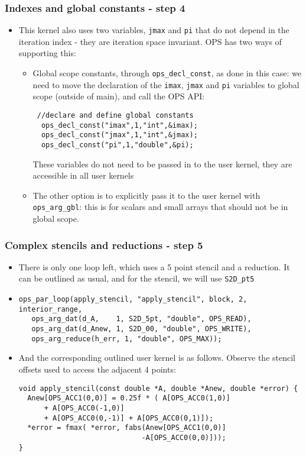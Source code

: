 \documentclass{beamer}
\begin{document}
\begin{frame}[fragile]
\frametitle{Indexes and global constants - step 4}
\begin{itemize}
\item This kernel also uses two variables, \texttt{jmax} and \texttt{pi} that do not depend in the iteration index - they are iteration space invariant. OPS has two ways of supporting this:
\begin{itemize}
\item Global scope constants, through \texttt{ops\_decl\_const}, as done in this case: we need to move the declaration of the \texttt{imax}, \texttt{jmax} and \texttt{pi} variables to global scope (outside of main), and call the OPS API:
\begin{lstlisting}
 //declare and define global constants
  ops_decl_const("imax",1,"int",&imax);
  ops_decl_const("jmax",1,"int",&jmax);
  ops_decl_const("pi",1,"double",&pi);
\end{lstlisting}  
These variables do not need to be passed in to the user kernel, they are accessible in all user kernels
\item The other option is to explicitly pass it to the user kernel with \texttt{ops\_arg\_gbl}: this is for scalars and small arrays that should not be in global scope.
\end{itemize}
\end{itemize}
\end{frame}

\begin{frame}[fragile]
\frametitle{Complex stencils and reductions - step 5}
\begin{itemize}
\item There is only one loop left, which uses a 5 point stencil and a reduction. It can be outlined as usual, and for the stencil, we will use \texttt{S2D\_pt5}
\item \begin{lstlisting}
ops_par_loop(apply_stencil, "apply_stencil", block, 2, interior_range,
   ops_arg_dat(d_A,    1, S2D_5pt, "double", OPS_READ),
   ops_arg_dat(d_Anew, 1, S2D_00, "double", OPS_WRITE),
   ops_arg_reduce(h_err, 1, "double", OPS_MAX));
\end{lstlisting}  
  \item And the corresponding outlined user kernel is as follows. Observe the stencil offsets used to access the adjacent 4 points:
\begin{lstlisting}
void apply_stencil(const double *A, double *Anew, double *error) {
  Anew[OPS_ACC1(0,0)] = 0.25f * ( A[OPS_ACC0(1,0)] 
      + A[OPS_ACC0(-1,0)]
      + A[OPS_ACC0(0,-1)] + A[OPS_ACC0(0,1)]);
  *error = fmax( *error, fabs(Anew[OPS_ACC1(0,0)]
                             -A[OPS_ACC0(0,0)]));
}
\end{lstlisting}  
\end{itemize}
\end{frame}
\end{document}
